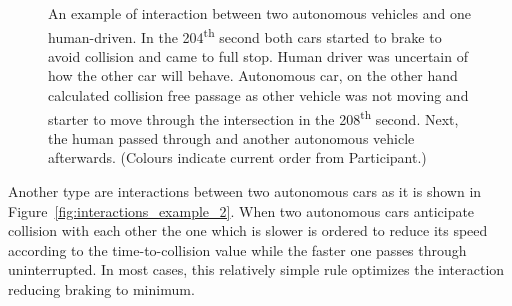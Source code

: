 \documentclass[11pt,english]{article}
\begin{document}



\begin{figure}[!] %
\caption{An example of interaction between two autonomous vehicles and one human-driven. In the 204\textsuperscript{th} second both cars started to brake to avoid collision and came to full stop. Human driver was uncertain of how the other car will behave. Autonomous car, on the other hand calculated collision free passage as other vehicle was not moving and starter to move through the intersection in the 208\textsuperscript{th} second. Next, the human passed through and another autonomous vehicle afterwards. (Colours indicate current order from Participant.)}
\label{fig:interactions_example_1v2}
\end{figure}

Another type are interactions between two autonomous cars as it is shown in Figure~\ref{fig:interactions_example_2}. When two autonomous cars anticipate collision with each other the one which is slower is ordered to reduce its speed according to the time-to-collision value while the faster one passes through uninterrupted. In most cases, this relatively simple rule optimizes the interaction reducing braking to minimum.  





\end{document}
